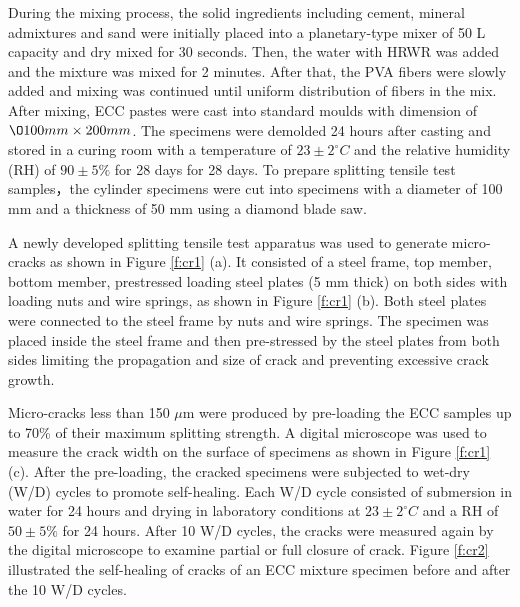 \documentclass[11pt]{article}
\begin{document}
	During the mixing process, the solid ingredients including cement, mineral admixtures and sand were initially placed into a planetary-type mixer of 50 L capacity and dry mixed for 30 seconds. Then, the water with HRWR was added and the mixture was mixed for 2 minutes. After that, the PVA fibers were slowly added and mixing was continued until uniform distribution of fibers in the mix. After mixing, ECC pastes were cast into standard moulds with dimension of $\O 100mm \times 200mm$. The specimens were demolded 24 hours after casting and stored in a curing room with a temperature of $23 \pm 2^\circ C$ and the relative humidity (RH) of $90 \pm 5\%$ for 28 days for 28 days. To prepare splitting tensile test samples，the cylinder specimens were cut into specimens with a diameter of 100 mm and a thickness of 50 mm using a diamond blade saw.

A newly developed splitting tensile test apparatus was used to generate micro-cracks as shown in Figure \ref{f:cr1} (a). It consisted of a steel frame, top member, bottom member, prestressed loading steel plates (5 mm thick) on both sides with loading nuts and wire springs, as shown in Figure \ref{f:cr1} (b). Both steel plates were connected to the steel frame by nuts and wire springs. The specimen was placed inside the steel frame and then pre-stressed by the steel plates from both sides limiting the propagation and size of crack and preventing excessive crack growth.

Micro-cracks less than 150 $\mu$m were produced by pre-loading the ECC samples up to 70\% of their maximum splitting strength. A digital microscope was used to measure the crack width on the surface of specimens as shown in Figure \ref{f:cr1} (c). After the pre-loading, the cracked specimens were subjected to wet-dry (W/D) cycles to promote self-healing. Each W/D cycle consisted of submersion in water  for 24 hours and drying in laboratory conditions at $23 \pm 2^\circ C$ and a RH of $50 \pm 5\%$ for 24 hours. After 10 W/D cycles, the cracks were measured again by the digital microscope to examine partial or full closure of crack. Figure \ref{f:cr2} illustrated the self-healing of cracks of an ECC mixture specimen before and after the 10 W/D cycles.
\end{document}
